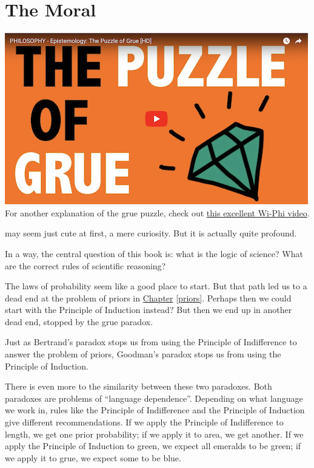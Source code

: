 \documentclass[justified]{tufte-book}
\theoremstyle{definition}
\theoremstyle{definition}
\theoremstyle{definition}
\theoremstyle{remark}
\begin{document}
\hypertarget{the-moral}{%
\section*{The Moral}\label{the-moral}}

\begin{marginfigure}
\href{http://www.wi-phi.com/video/puzzle-grue}{\includegraphics{img/wiphi_grue.png}}
For another explanation of the grue puzzle, check out
\href{http://www.wi-phi.com/video/puzzle-grue}{this excellent Wi-Phi
video}.
\end{marginfigure}

 may seem just cute at first, a mere
curiosity. But it is actually quite profound.

In a way, the central question of this book is: what is the logic of
science? What are the correct rules of scientific reasoning?

The laws of probability seem like a good place to start. But that path
led us to a dead end at the problem of priors in
\protect\hyperlink{priors}{Chapter} \ref{priors}. Perhaps then we could
start with the Principle of Induction instead? But then we end up in
another dead end, stopped by the grue paradox.

Just as Bertrand's paradox stops us from using the Principle of
Indifference to answer the problem of priors, Goodman's paradox stops us
from using the Principle of Induction.

There is even more to the similarity between these two paradoxes. Both
paradoxes are problems of ``language dependence''. Depending on what
language we work in, rules like the Principle of Indifference and the
Principle of Induction give different recommendations. If we apply the
Principle of Indifference to length, we get one prior probability; if we
apply it to area, we get another. If we apply the Principle of Induction
to green, we expect all emeralds to be green; if we apply it to grue, we
expect some to be blue.
\end{document}
